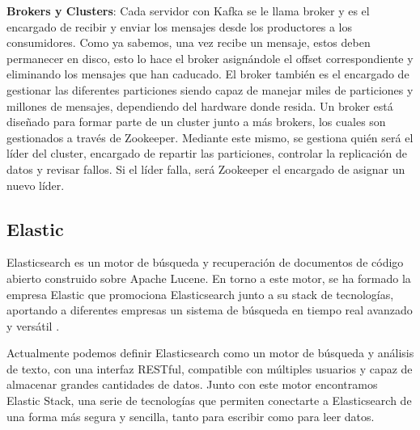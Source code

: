 \textbf{Brokers y Clusters}: Cada servidor con Kafka se le llama broker y es el encargado de recibir y enviar los mensajes desde los productores a los consumidores. Como ya sabemos, una vez recibe un mensaje, estos deben permanecer en disco, esto lo hace el broker asignándole el offset correspondiente y eliminando los mensajes que han caducado. El broker también es el encargado de gestionar las diferentes particiones siendo capaz de manejar miles de particiones y millones de mensajes, dependiendo del hardware donde resida. Un broker está diseñado para formar parte de un cluster junto a más brokers, los cuales son gestionados a través de Zookeeper. Mediante este mismo, se gestiona quién será el líder del cluster, encargado de repartir las particiones, controlar la replicación de datos y revisar fallos. Si el líder falla, será Zookeeper el encargado de asignar un nuevo líder. 


\subsection{Elastic\label{Elastic}}

Elasticsearch es un motor de búsqueda y recuperación de documentos de código abierto construido sobre Apache Lucene. En torno a este motor, se ha formado la empresa Elastic que promociona Elasticsearch junto a su stack de tecnologías, aportando a diferentes empresas un sistema de búsqueda en tiempo real avanzado y versátil \cite{Elk-1}.\par

Actualmente podemos definir Elasticsearch como un motor de búsqueda y análisis de texto, con una interfaz RESTful, compatible con múltiples usuarios y capaz de almacenar grandes cantidades de datos. Junto con este motor encontramos Elastic Stack, una serie de tecnologías que permiten conectarte a Elasticsearch de una forma más segura y sencilla, tanto para escribir como para leer datos.\par

